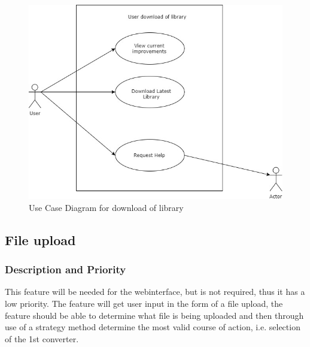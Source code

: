 \documentclass[english]{article}
\begin{document}
		\begin{figure}[h]
			\includegraphics[width=\textwidth]{Use Cases/LibraryDownload.jpg}
			\caption{Use Case Diagram for download of library }
		\end{figure}
		\pagebreak	
			
		\subsection{File upload}

			 \subsubsection{Description and Priority}
			 	This feature will be needed for the webinterface, but is not required, thus it has a low priority. The feature will get user input in the form of a file upload, the feature should be able to determine what file is being uploaded and then through use of a strategy method determine the most valid course of action, i.e. selection of the 1st converter.
			 	
\end{document}
